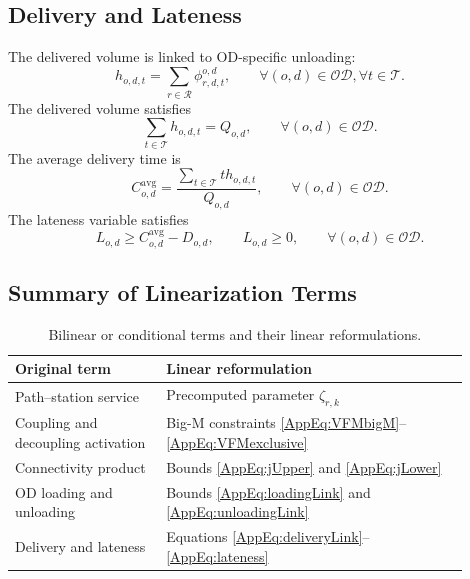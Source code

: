 \documentclass[11pt]{article}
\begin{document}
\subsection{Delivery and Lateness}
\label{App:Delivery}

The delivered volume is linked to OD-specific unloading:
\begin{equation}
h_{o,d,t}
=
\sum_{r\in\mathcal{R}}
\phi_{r,d,t}^{o,d},
\qquad
\forall (o,d)\in\mathcal{OD},
\forall t\in\mathcal{T}.
\label{AppEq:deliveryLink}
\end{equation}
The delivered volume satisfies
\begin{equation}
\sum_{t\in\mathcal{T}}h_{o,d,t}=Q_{o,d},
\qquad
\forall (o,d)\in\mathcal{OD}.
\label{AppEq:deliveryConservation}
\end{equation}
The average delivery time is
\begin{equation}
C_{o,d}^{\mathrm{avg}}
=
\frac{
\sum_{t\in\mathcal{T}}t h_{o,d,t}
}{
Q_{o,d}
},
\qquad
\forall (o,d)\in\mathcal{OD}.
\label{AppEq:avgDelivery}
\end{equation}
The lateness variable satisfies
\begin{equation}
L_{o,d}
\geq
C_{o,d}^{\mathrm{avg}}-D_{o,d},
\qquad
L_{o,d}\geq 0,
\qquad
\forall (o,d)\in\mathcal{OD}.
\label{AppEq:lateness}
\end{equation}

\clearpage
\subsection{Summary of Linearization Terms}
\label{App:LinearizationSummary}

\begin{table}[!htbp]
\centering
\small
\caption{Bilinear or conditional terms and their linear reformulations.}
\label{AppTab:linearization}
\begin{tabular}{p{0.30\linewidth}p{0.60\linewidth}}
\toprule
\textbf{Original term} & \textbf{Linear reformulation} \\
\midrule
Path--station service & Precomputed parameter $\zeta_{r,k}$ \\
Coupling and decoupling activation & Big-M constraints \eqref{AppEq:VFMbigM}--\eqref{AppEq:VFMexclusive} \\
Connectivity product & Bounds \eqref{AppEq:jUpper} and \eqref{AppEq:jLower} \\
OD loading and unloading & Bounds \eqref{AppEq:loadingLink} and \eqref{AppEq:unloadingLink} \\
Delivery and lateness & Equations \eqref{AppEq:deliveryLink}--\eqref{AppEq:lateness} \\
\bottomrule
\end{tabular}
\end{table}
\end{document}
